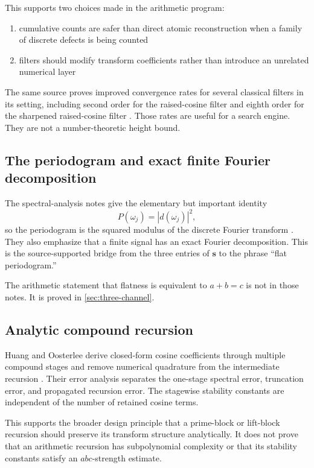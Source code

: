 \documentclass[11pt]{article}
\begin{document}
This supports two choices made in the arithmetic program:

\begin{enumerate}
  \item cumulative counts are safer than direct atomic reconstruction when a family of discrete defects is being counted
  \item filters should modify transform coefficients rather than introduce an unrelated numerical layer
\end{enumerate}

The same source proves improved convergence rates for several classical filters in its setting, including second order for the raised-cosine filter and eighth order for the sharpened raised-cosine filter \cite{ShenFangLiu2024}.  Those rates are useful for a search engine.  They are not a number-theoretic height bound.

\subsection{The periodogram and exact finite Fourier decomposition}

The spectral-analysis notes give the elementary but important identity
\[
  P(\omega_j)=|d(\omega_j)|^2,
\]
so the periodogram is the squared modulus of the discrete Fourier transform \cite{Tibshirani2024}.  They also emphasize that a finite signal has an exact Fourier decomposition.  This is the source-supported bridge from the three entries of $\mathbf s$ to the phrase ``flat periodogram.''

The arithmetic statement that flatness is equivalent to $a+b=c$ is not in those notes.  It is proved in \cref{sec:three-channel}.

\subsection{Analytic compound recursion}

Huang and Oosterlee derive closed-form cosine coefficients through multiple compound stages and remove numerical quadrature from the intermediate recursion \cite{HuangOosterlee2026}.  Their error analysis separates the one-stage spectral error, truncation error, and propagated recursion error.  The stagewise stability constants are independent of the number of retained cosine terms.

This supports the broader design principle that a prime-block or lift-block recursion should preserve its transform structure analytically.  It does not prove that an arithmetic recursion has subpolynomial complexity or that its stability constants satisfy an $abc$-strength estimate.
\end{document}

